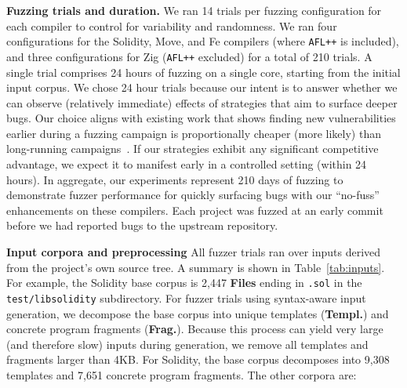 \noindent \textbf{Fuzzing trials and duration.} We ran 14 trials per fuzzing
configuration for each compiler to control for variability and randomness.  We
ran four configurations for the Solidity, Move, and Fe compilers (where
\texttt{AFL++} is included), and three configurations for Zig (\texttt{AFL++}
excluded) for a total of 210 trials.  A single trial comprises 24 hours of
fuzzing on a single core, starting from the initial input corpus.  
We chose 24 hour trials because our intent is to
answer whether we can observe (relatively immediate) effects of strategies that
aim to surface deeper bugs.  Our choice aligns with existing work that shows
finding new vulnerabilities earlier during a fuzzing campaign is proportionally
cheaper (more likely) than long-running campaigns~\cite{fuzzexp}. If our
strategies exhibit any significant competitive advantage, we expect it
to manifest
early in a controlled setting (within 24 hours).  In aggregate, our
experiments represent 210 days of fuzzing to demonstrate fuzzer performance for
quickly surfacing bugs with our ``no-fuss'' enhancements on these compilers.
Each project was fuzzed at an early commit before we had reported bugs to the
upstream repository.

\begin{sloppypar}
\noindent 
\textbf{Input corpora and preprocessing} All fuzzer trials ran over inputs derived from the
project's own source tree. A summary is shown in Table~\ref{tab:inputs}. For
example, the Solidity base corpus is 2,447 \textbf{Files} ending in
\texttt{.sol} in the \texttt{test/libsolidity} subdirectory.  For fuzzer trials
using syntax-aware input generation, we decompose the base corpus into unique
templates (\textbf{Templ.}) and concrete program fragments (\textbf{Frag.}).
Because this process can yield very large (and therefore slow) inputs during
generation, we remove all templates and fragments larger than 4KB.  For
Solidity, the base corpus decomposes into 9,308 templates and 7,651 concrete
program fragments.  The other corpora are:
\end{sloppypar}

